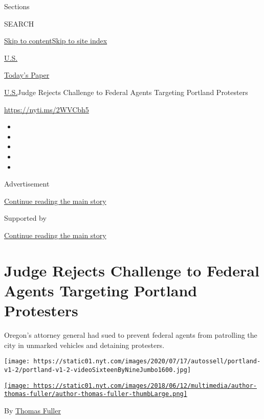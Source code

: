 Sections

SEARCH

\protect\hyperlink{site-content}{Skip to
content}\protect\hyperlink{site-index}{Skip to site index}

\href{https://www.nytimes.com/section/us}{U.S.}

\href{https://myaccount.nytimes.com/auth/login?response_type=cookie\&client_id=vi}{}

\href{https://www.nytimes.com/section/todayspaper}{Today's Paper}

\href{/section/us}{U.S.}\textbar{}Judge Rejects Challenge to Federal
Agents Targeting Portland Protesters

\url{https://nyti.ms/2WVCbh5}

\begin{itemize}
\item
\item
\item
\item
\item
\end{itemize}

Advertisement

\protect\hyperlink{after-top}{Continue reading the main story}

Supported by

\protect\hyperlink{after-sponsor}{Continue reading the main story}

\hypertarget{judge-rejects-challenge-to-federal-agents-targeting-portland-protesters}{%
\section{Judge Rejects Challenge to Federal Agents Targeting Portland
Protesters}\label{judge-rejects-challenge-to-federal-agents-targeting-portland-protesters}}

Oregon's attorney general had sued to prevent federal agents from
patrolling the city in unmarked vehicles and detaining protesters.

\texttt{[image: https://static01.nyt.com/images/2020/07/17/autossell/portland-v1-2/portland-v1-2-videoSixteenByNineJumbo1600.jpg]}

\href{https://www.nytimes.com/by/thomas-fuller}{\texttt{[image: https://static01.nyt.com/images/2018/06/12/multimedia/author-thomas-fuller/author-thomas-fuller-thumbLarge.png]}}

By \href{https://www.nytimes.com/by/thomas-fuller}{Thomas Fuller}

